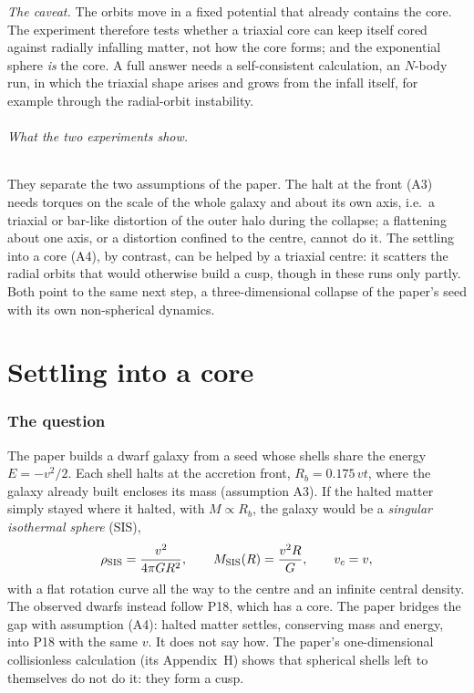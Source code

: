 \documentclass[11pt,a4paper]{article}
\newcommand{\Rb}{R_b}
\begin{document}
\emph{The caveat.} The orbits move in a fixed potential that already contains the
core. The experiment therefore tests whether a triaxial core can keep itself cored
against radially infalling matter, not how the core forms; and the exponential sphere
\emph{is} the core. A full answer needs a self-consistent calculation, an $N$-body
run, in which the triaxial shape arises and grows from the infall itself, for example
through the radial-orbit instability.

\paragraph{What the two experiments show.} They separate the two assumptions of the
paper. The halt at the front (A3) needs torques on the scale of the whole galaxy and
about its own axis, i.e.\ a triaxial or bar-like distortion of the outer halo during
the collapse; a flattening about one axis, or a distortion confined to the centre,
cannot do it. The settling into a core (A4), by contrast, can be helped by a triaxial
centre: it scatters the radial orbits that would otherwise build a cusp, though in
these runs only partly. Both point to the same next step, a three-dimensional
collapse of the paper's seed with its own non-spherical dynamics.


\part{Settling into a core}

\section{The question}

The paper builds a dwarf galaxy from a seed whose shells share the energy
$E=-v^2/2$. Each shell halts at the accretion front, $\Rb=0.175\,vt$, where the
galaxy already built encloses its mass (assumption A3). If the halted matter simply
stayed where it halted, with $M\propto\Rb$, the galaxy would be a \emph{singular
isothermal sphere} (SIS),
\begin{equation}
  \rho_{\rm SIS}=\frac{v^2}{4\pi GR^2},\qquad M_{\rm SIS}(R)=\frac{v^2R}{G},
  \qquad v_c=v,
  \label{eq:sis}
\end{equation}
with a flat rotation curve all the way to the centre and an infinite central
density. The observed dwarfs instead follow P18, which has a core. The paper bridges
the gap with assumption (A4): halted matter settles, conserving mass and energy,
into P18 with the same $v$. It does not say how. The paper's one-dimensional
collisionless calculation (its Appendix~H) shows that spherical shells left to
themselves do not do it: they form a cusp.
\end{document}
